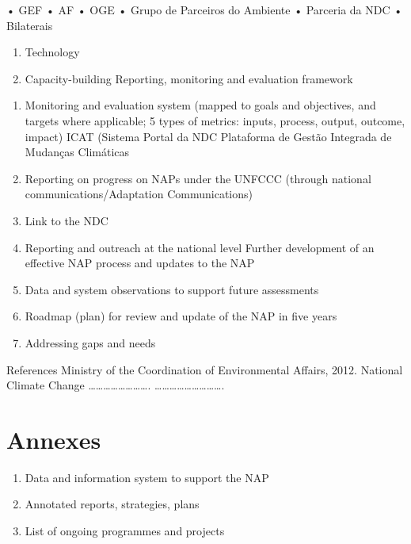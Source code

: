 \documentclass[
]{book}
\providecommand{\tightlist}{%
  \setlength{\itemsep}{0pt}\setlength{\parskip}{0pt}}
\begin{document}
• GEF
• AF
• OGE
• Grupo de Parceiros do Ambiente
• Parceria da NDC
• Bilaterais

\begin{enumerate}
\def\labelenumi{\roman{enumi}.}
\setcounter{enumi}{2}
\item
  Technology
\item
  Capacity-building
  Reporting, monitoring and evaluation framework
\end{enumerate}

\begin{enumerate}
\def\labelenumi{\alph{enumi}.}
\item
  Monitoring and evaluation system (mapped to goals and objectives, and targets where applicable; 5 types of metrics: inputs, process, output, outcome, impact)
  ICAT (Sistema
  Portal da NDC
  Plataforma de Gestão Integrada de Mudanças Climáticas
\item
  Reporting on progress on NAPs under the UNFCCC (through national communications/Adaptation Communications)
\item
  Link to the NDC
\item
  Reporting and outreach at the national level
  Further development of an effective NAP process and updates to the NAP
\item
  Data and system observations to support future assessments
\item
  Roadmap (plan) for review and update of the NAP in five years
\item
  Addressing gaps and needs
\end{enumerate}

References
Ministry of the Coordination of Environmental Affairs, 2012. National Climate Change
\ldots\ldots\ldots\ldots\ldots\ldots\ldots\ldots.
\ldots\ldots\ldots\ldots\ldots\ldots\ldots\ldots\ldots.

\hypertarget{annexes}{%
\chapter{Annexes}\label{annexes}}

\begin{enumerate}
\def\labelenumi{\alph{enumi}.}
\tightlist
\item
  Data and information system to support the NAP
\item
  Annotated reports, strategies, plans
\item
  List of ongoing programmes and projects
\end{enumerate}

  
\end{document}
